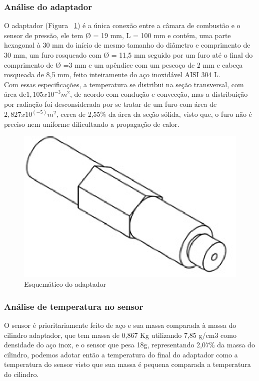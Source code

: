 \subsubsection{Análise do adaptador}
O adaptador (Figura ~\ref{fig2tc}) é a única conexão entre a câmara de combustão e o sensor de pressão, ele tem Ø = 19 mm, L = 100 mm e contém, uma parte hexagonal à 30 mm do início de mesmo tamanho do diâmetro e comprimento de 30 mm, um furo rosqueado com Ø = 11,5 mm seguido por um furo até o final do comprimento de Ø =3 mm e um apêndice com um pescoço de 2 mm e cabeça rosqueada de 8,5 mm, feito inteiramente do aço inoxidável AISI 304 L.\\
Com essas especificações, a temperatura se distribui na seção transversal, com área de$ 1,105 x10^{-3}m^2$, de acordo com condução e convecção, mas a distribuição por radiação foi desconsiderada por se tratar de um furo com área de $2,827 x 10^{(-5)}m^2$, cerca de 2,55\% da área da seção sólida, visto que, o furo não é preciso nem uniforme dificultando a propagação de calor.
\begin{figure}[!htb]                  
	\centering                          
	\includegraphics[scale=1]{figuras/Figura2tc.eps}
	\caption{Esquemático do adaptador} \label{fig2tc}              
\end{figure}
\subsubsection{Análise de temperatura no sensor}
O sensor é prioritariamente feito de aço e sua massa comparada à massa do cilindro adaptador, que tem massa de 0,867 Kg utilizando 7,85 g/cm3 como densidade do aço inox, e o sensor que pesa 18g, representando 2,07\% da massa do cilindro, podemos adotar então a temperatura do final do adaptador como a temperatura do sensor visto que sua massa é pequena comparada a temperatura do cilindro.
